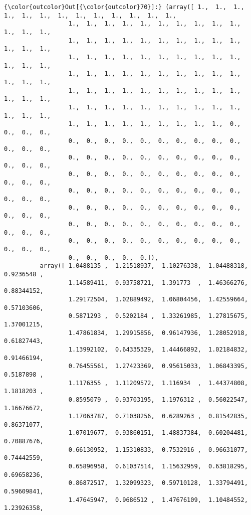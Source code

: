 \documentclass[11pt]{article}
\begin{document}
\begin{Verbatim}[commandchars=\\\{\}]
{\color{outcolor}Out[{\color{outcolor}70}]:} (array([ 1.,  1.,  1.,  1.,  1.,  1.,  1.,  1.,  1.,  1.,  1.,  1.,  1.,
                  1.,  1.,  1.,  1.,  1.,  1.,  1.,  1.,  1.,  1.,  1.,  1.,  1.,
                  1.,  1.,  1.,  1.,  1.,  1.,  1.,  1.,  1.,  1.,  1.,  1.,  1.,
                  1.,  1.,  1.,  1.,  1.,  1.,  1.,  1.,  1.,  1.,  1.,  1.,  1.,
                  1.,  1.,  1.,  1.,  1.,  1.,  1.,  1.,  1.,  1.,  1.,  1.,  1.,
                  1.,  1.,  1.,  1.,  1.,  1.,  1.,  1.,  1.,  1.,  1.,  1.,  1.,
                  1.,  1.,  1.,  1.,  1.,  1.,  1.,  1.,  1.,  1.,  1.,  1.,  1.,
                  1.,  1.,  1.,  1.,  1.,  1.,  1.,  1.,  1.,  0.,  0.,  0.,  0.,
                  0.,  0.,  0.,  0.,  0.,  0.,  0.,  0.,  0.,  0.,  0.,  0.,  0.,
                  0.,  0.,  0.,  0.,  0.,  0.,  0.,  0.,  0.,  0.,  0.,  0.,  0.,
                  0.,  0.,  0.,  0.,  0.,  0.,  0.,  0.,  0.,  0.,  0.,  0.,  0.,
                  0.,  0.,  0.,  0.,  0.,  0.,  0.,  0.,  0.,  0.,  0.,  0.,  0.,
                  0.,  0.,  0.,  0.,  0.,  0.,  0.,  0.,  0.,  0.,  0.,  0.,  0.,
                  0.,  0.,  0.,  0.,  0.,  0.,  0.,  0.,  0.,  0.,  0.,  0.,  0.,
                  0.,  0.,  0.,  0.,  0.,  0.,  0.,  0.,  0.,  0.,  0.,  0.,  0.,
                  0.,  0.,  0.,  0.,  0.]),
          array([ 1.0488135 ,  1.21518937,  1.10276338,  1.04488318,  0.9236548 ,
                  1.14589411,  0.93758721,  1.391773  ,  1.46366276,  0.88344152,
                  1.29172504,  1.02889492,  1.06804456,  1.42559664,  0.57103606,
                  0.5871293 ,  0.5202184 ,  1.33261985,  1.27815675,  1.37001215,
                  1.47861834,  1.29915856,  0.96147936,  1.28052918,  0.61827443,
                  1.13992102,  0.64335329,  1.44466892,  1.02184832,  0.91466194,
                  0.76455561,  1.27423369,  0.95615033,  1.06843395,  0.5187898 ,
                  1.1176355 ,  1.11209572,  1.116934  ,  1.44374808,  1.1818203 ,
                  0.8595079 ,  0.93703195,  1.1976312 ,  0.56022547,  1.16676672,
                  1.17063787,  0.71038256,  0.6289263 ,  0.81542835,  0.86371077,
                  1.07019677,  0.93860151,  1.48837384,  0.60204481,  0.70887676,
                  0.66130952,  1.15310833,  0.7532916 ,  0.96631077,  0.74442559,
                  0.65896958,  0.61037514,  1.15632959,  0.63818295,  0.69658236,
                  0.86872517,  1.32099323,  0.59710128,  1.33794491,  0.59609841,
                  1.47645947,  0.9686512 ,  1.47676109,  1.10484552,  1.23926358,

\end{Verbatim}
\end{document}
